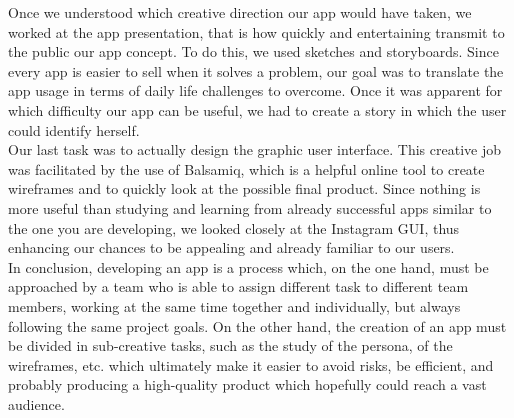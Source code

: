 \documentclass[12pt]{scrartcl}
\begin{document}
	Once we understood which creative direction our app would have taken, we worked at the app presentation, that is how quickly and entertaining transmit to the public our app concept. To do this, we used sketches and storyboards. Since every app is easier to sell when it solves a problem, our goal was to translate the app usage in terms of daily life challenges to overcome. Once it was apparent for which difficulty our app can be useful, we had to create a story in which the user could identify herself.\\
  
	Our last task was to actually design the graphic user interface. This creative job was facilitated by the use of Balsamiq, which is a helpful online tool to create wireframes and to quickly look at the possible final product. Since nothing is more useful than studying and learning from already successful apps similar to the one you are developing, we looked closely at the Instagram GUI, thus enhancing our chances to be appealing and already familiar to our users. \\
  
	In conclusion, developing an app is a process which, on the one hand, must be approached by a team who is able to assign different task to different team members, working at the same time together and individually, but always following the same project goals. On the other hand, the creation of an app must be divided in sub-creative tasks, such as the study of the persona, of the wireframes, etc. which ultimately make it easier to avoid risks, be efficient, and probably producing a high-quality product which hopefully could reach a vast audience.	
\end{document}
